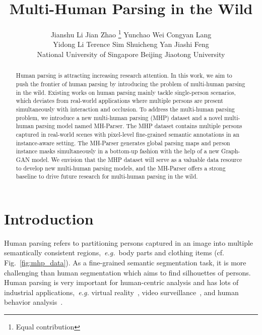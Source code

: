 \documentclass[10pt, letterpaper]{article}
\begin{document}
\title{Multi-Human Parsing in the Wild}

\author{Jianshu Li  \quad Jian Zhao \thanks{Equal contribution} \quad Yunchao Wei  \quad Congyan Lang  \\ 
\smallskip\smallskip\smallskip
Yidong Li  \quad Terence Sim  \quad Shuicheng Yan  \quad  Jiashi Feng  \\
\smallskip\smallskip\smallskip
National University of Singapore  \quad   Beijing Jiaotong University \\
}


\maketitle

\begin{abstract}
Human parsing is attracting increasing research attention. In this work, we aim to push the frontier of human parsing by introducing the problem of multi-human parsing in the wild. Existing works on human parsing mainly tackle single-person scenarios, which deviates from real-world applications where multiple persons are present simultaneously with interaction and occlusion. To address the multi-human parsing problem, we introduce a new multi-human parsing (MHP) dataset and a novel multi-human parsing model named MH-Parser. The MHP dataset contains multiple persons captured in real-world scenes with pixel-level fine-grained semantic annotations in an instance-aware setting. The MH-Parser generates global parsing maps and person instance masks simultaneously in a bottom-up fashion with the help of a new Graph-GAN model. We envision that the MHP dataset will serve as a valuable data resource to develop new multi-human parsing models, and the MH-Parser offers a strong baseline to drive future research for multi-human parsing in the wild.
\end{abstract}


\section{Introduction}
Human parsing refers to partitioning persons captured in an image into multiple semantically consistent regions,~\emph{e.g.}~body parts and clothing items (cf. Fig.~\ref{fig:mhp_data}). As a fine-grained semantic segmentation task, it is more challenging than human segmentation which aims to find silhouettes of persons. Human parsing is very important for human-centric analysis and has lots of industrial applications,~\emph{e.g.} virtual reality~\cite{lin2016virtual}, video surveillance~\cite{collins2000system}, and human behavior analysis~\cite{gan2016concepts,liang2015proposal}. 
\end{document}
